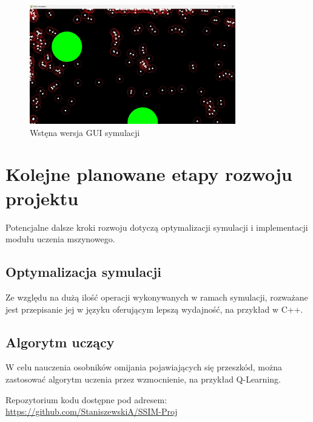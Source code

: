 \documentclass[12pt,a4paper,table]{article}
\begin{document}
    \begin{figure}[H]
        \centering
        \includegraphics[width=0.8\textwidth]{images/gui1.jpg}
        \caption{Wstęna wersja GUI symulacji}
        \label{fig:example}
    \end{figure}

    \section{Kolejne planowane etapy rozwoju projektu}
    Potencjalne dalsze kroki rozwoju dotyczą optymalizacji symulacji i implementacji modułu uczenia mszynowego.
    \subsection{Optymalizacja symulacji}
    Ze względu na dużą ilość operacji wykonywanych w ramach symulacji, rozważane jest przepisanie jej w języku oferującym lepszą wydajność, na przykład w C++.
    
    \subsection{Algorytm uczący}
    W celu nauczenia osobników omijania pojawiających się przeszkód, można zastosować algorytm uczenia przez wzmocnienie, na przykład Q-Learning.

    \vspace{2em}

    Repozytorium kodu dostępne pod adresem:
    \url{https://github.com/StaniszewskiA/SSIM-Proj}
\end{document}
